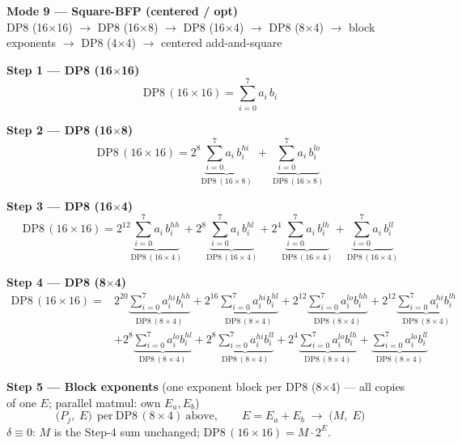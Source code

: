 \documentclass[fleqn]{article}
\newcommand{\DPop}[3]{\mathrm{DP#1}\,(#2\!\times\!#3)}
\begin{document}
\begin{center}
{\LARGE \textbf{Mode 9 --- Square-BFP (centered / opt)}}\\[4pt]
{\large DP8 (16$\times$16) $\rightarrow$ DP8 (16$\times$8) $\rightarrow$ DP8 (16$\times$4) $\rightarrow$ DP8 (8$\times$4) $\rightarrow$ block exponents $\rightarrow$ DP8 (4$\times$4) $\rightarrow$ centered add-and-square}
\end{center}

\vspace{0.1em}

\textbf{Step 1 --- DP8 (16$\times$16)}
\[
\DPop{8}{16}{16} = \sum_{i=0}^{7} a_i \, b_i
\]

\textbf{Step 2 --- DP8 (16$\times$8)}
\[
\DPop{8}{16}{16}
  = 2^{8} \underbrace{\sum_{i=0}^{7} a_i \, b_i^{hi}}_{\DPop{8}{16}{8}}
  \; + \; \underbrace{\sum_{i=0}^{7} a_i \, b_i^{lo}}_{\DPop{8}{16}{8}}
\]

\textbf{Step 3 --- DP8 (16$\times$4)}
\[
\DPop{8}{16}{16}
  = 2^{12} \underbrace{\sum_{i=0}^{7} a_i \, b_i^{hh}}_{\DPop{8}{16}{4}}
  + 2^{8} \underbrace{\sum_{i=0}^{7} a_i \, b_i^{hl}}_{\DPop{8}{16}{4}}
  + 2^{4} \underbrace{\sum_{i=0}^{7} a_i \, b_i^{lh}}_{\DPop{8}{16}{4}}
  + \underbrace{\sum_{i=0}^{7} a_i \, b_i^{ll}}_{\DPop{8}{16}{4}}
\]

\textbf{Step 4 --- DP8 (8$\times$4)}
\begin{align*}
\DPop{8}{16}{16} = {}
  & 2^{20} \underbrace{\sum_{i=0}^{7} a_i^{hi} b_i^{hh}}_{\DPop{8}{8}{4}}
  + 2^{16} \underbrace{\sum_{i=0}^{7} a_i^{hi} b_i^{hl}}_{\DPop{8}{8}{4}}
  + 2^{12} \underbrace{\sum_{i=0}^{7} a_i^{lo} b_i^{hh}}_{\DPop{8}{8}{4}}
  + 2^{12} \underbrace{\sum_{i=0}^{7} a_i^{hi} b_i^{lh}}_{\DPop{8}{8}{4}} \\[1em]
  & + 2^{8} \underbrace{\sum_{i=0}^{7} a_i^{lo} b_i^{hl}}_{\DPop{8}{8}{4}}
  + 2^{8} \underbrace{\sum_{i=0}^{7} a_i^{hi} b_i^{ll}}_{\DPop{8}{8}{4}}
  + 2^{4} \underbrace{\sum_{i=0}^{7} a_i^{lo} b_i^{lh}}_{\DPop{8}{8}{4}}
  + \underbrace{\sum_{i=0}^{7} a_i^{lo} b_i^{ll}}_{\DPop{8}{8}{4}}
\end{align*}

\textbf{Step 5 --- Block exponents}\quad
{\small(one exponent block per DP8 (8$\times$4) --- all copies of one $E$; parallel matmul: own $E_a,E_b$)}
\[
\big(P_j,\; E\big)\ \ \text{per}\ \DPop{8}{8}{4}\ \text{above}, \qquad E = E_a + E_b
\;\longrightarrow\;
\big(M,\; E\big)
\]
$\delta\equiv0$: $M$ is the Step-4 sum unchanged; \quad $\DPop{8}{16}{16}=M\cdot2^{E}$.
\end{document}

